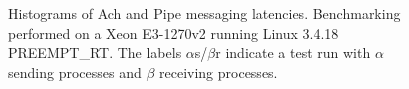 \documentclass[letterpaper]{IEEEtran}
\begin{document}
\begin{figure}
{  }
  \caption{Histograms of Ach and Pipe messaging latencies.
    Benchmarking performed on a Xeon E3-1270v2 running Linux 3.4.18
    PREEMPT\_RT. The labels $\alpha$s/$\beta$r indicate a test run with
    $\alpha$ sending processes and $\beta$ receiving processes. }
  \label{fig:bench1}
  \vspace{-15pt}
\end{figure}
\end{document}

